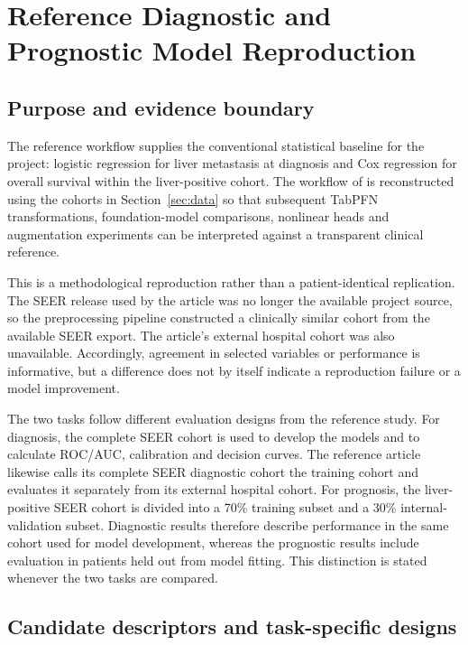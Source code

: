 \section{Reference Diagnostic and Prognostic Model Reproduction}
\label{sec:reference}

\subsection{Purpose and evidence boundary}
\label{sec:reference:scope}

The reference workflow supplies the conventional statistical baseline for the
project: logistic regression for liver metastasis at diagnosis and Cox regression
for overall survival within the liver-positive cohort. The workflow of
\citet{Li2023} is reconstructed using the cohorts in Section~\ref{sec:data} so that
subsequent TabPFN transformations, foundation-model comparisons, nonlinear heads
and augmentation experiments can be interpreted against a transparent clinical
reference.

This is a methodological reproduction rather than a patient-identical replication.
The SEER release used by the article was no longer the available project source, so
the preprocessing pipeline constructed a clinically similar cohort from the
available SEER export. The article's external hospital cohort was also unavailable.
Accordingly, agreement in selected variables or performance is informative, but a
difference does not by itself indicate a reproduction failure or a model improvement.

The two tasks follow different evaluation designs from the reference study. For
diagnosis, the complete SEER cohort is used to develop the models and to calculate
ROC/AUC, calibration and decision curves. The reference article likewise calls its
complete SEER diagnostic cohort the training cohort and evaluates it separately
from its external hospital cohort. For prognosis, the liver-positive SEER cohort
is divided into a 70\% training subset and a 30\% internal-validation subset.
Diagnostic results therefore describe performance in the same cohort used for
model development, whereas the prognostic results include evaluation in patients
held out from model fitting. This distinction is stated whenever the two tasks are
compared.

\subsection{Candidate descriptors and task-specific designs}
\label{sec:reference:candidates}

